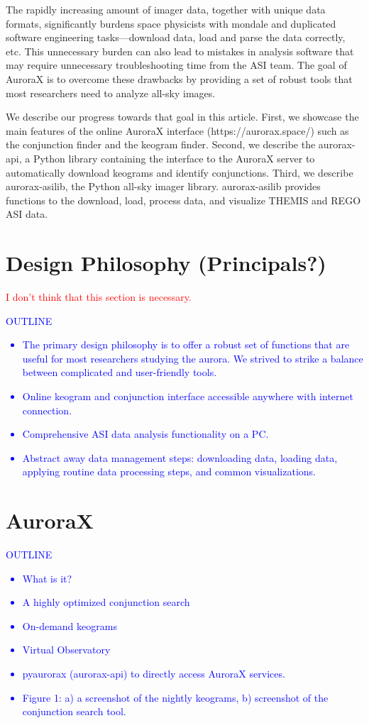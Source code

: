 \documentclass[draft]{agujournal2019}
\begin{document}
The rapidly increasing amount of imager data, together with unique data formats, significantly burdens space physicists with mondale and duplicated software engineering tasks---download data, load and parse the data correctly, etc. This unnecessary burden can also lead to mistakes in analysis software that may require unnecessary troubleshooting time from the ASI team. The goal of AuroraX is to overcome these drawbacks by providing a set of robust tools that most researchers need to analyze all-sky images. 

We describe our progress towards that goal in this article. First, we showcase the main features of the online AuroraX interface (https://aurorax.space/) such as the conjunction finder and the keogram finder. Second, we describe the aurorax-api, a Python library containing the interface to the AuroraX server to automatically download keograms and identify conjunctions. Third, we describe aurorax-asilib, the Python all-sky imager library. aurorax-asilib provides functions to the download, load, process data, and visualize THEMIS and REGO ASI data. 


\section{Design Philosophy (Principals?)}
\textcolor{red}{I don't think that this section is necessary.}
\textcolor{blue}{
      OUTLINE
      \begin{itemize}
            \item The primary design philosophy is to offer a robust set of functions that are useful for most researchers studying the aurora. We strived to strike a balance between complicated and user-friendly tools. 
            \item Online keogram and conjunction interface accessible anywhere with internet connection.
            \item Comprehensive ASI data analysis functionality on a PC.
            \item Abstract away data management steps: downloading data, loading data, applying routine data processing steps, and common visualizations.
      \end{itemize}
}

\section{AuroraX}\label{aurorax}
\textcolor{blue}{
      OUTLINE
      \begin{itemize}
            \item What is it?
            \item A highly optimized conjunction search
            \item On-demand keograms
            \item Virtual Observatory
            \item pyaurorax (aurorax-api) to directly access AuroraX services.
            \item Figure 1: a) a screenshot of the nightly keograms, b) screenshot of the conjunction search tool. 
      \end{itemize}
}
\end{document}
